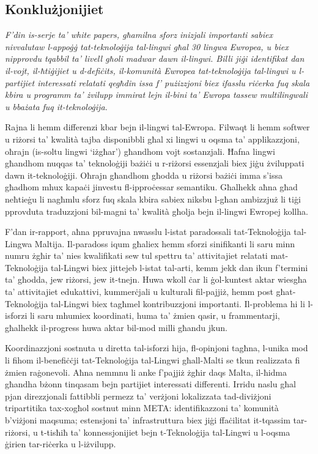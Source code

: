 \documentclass[]{../../metanetpaper}
\begin{document}
\begin{multicols}{2}
\subsection{Konklużjonijiet}

\emph{F’din is-serje ta’ \emph{white papers}, għamilna sforz inizjali importanti sabiex nivvalutaw l-appoġġ tat-teknoloġija tal-lingwi għal 30 lingwa Ewropea, u biex nipprovdu tqabbil ta’ livell għoli madwar dawn il-lingwi. Billi jiġi identifikat dan il-vojt, il-ħtiġijiet u d-defiċits, il-komunità Ewropea tat-teknoloġija tal-lingwi u l-partijiet interessati relatati qegħdin issa f’ pużizzjoni biex ifasslu riċerka fuq skala kbira u programm ta’ żvilupp immirat lejn il-bini ta’ Ewropa tassew multilingwali u bbażata fuq it-teknoloġija.}

Rajna li hemm differenzi kbar bejn il-lingwi tal-Ewropa. Filwaqt li hemm softwer u riżorsi ta’ kwalità tajba disponibbli għal xi lingwi u oqsma ta’ applikazzjoni, oħrajn (is-soltu lingwi `iżgħar') għandhom vojt sostanzjali.  Ħafna lingwi għandhom nuqqas ta’ teknoloġiji bażiċi u r-riżorsi essenzjali biex jiġu żviluppati dawn it-teknoloġiji. Oħrajn għandhom għodda u riżorsi bażiċi imma s’issa għadhom mhux kapaċi jinvestu fl-ipproċessar semantiku. Għalhekk aħna għad neħtieġu li nagħmlu sforz fuq skala kbira sabiex niksbu l-għan ambizzjuż li tiġi pprovduta traduzzjoni bil-magni ta’ kwalità għolja bejn il-lingwi Ewropej kollha. 

F’dan ir-rapport, aħna ppruvajna nwasslu l-istat paradossali tat-Teknoloġija tal-Lingwa Maltija. Il-paradoss iqum għaliex hemm sforzi sinifikanti li saru minn numru żgħir ta’ nies kwalifikati sew  tul spettru ta’ attivitajiet relatati mat-Teknoloġija tal-Lingwi biex jittejeb l-istat tal-arti, kemm jekk dan ikun f’termini ta’ għodda, jew riżorsi, jew it-tnejn. Huwa wkoll ċar li ġol-kuntest aktar wiesgħa ta’ attivitajiet edukattivi, kummerċjali u kulturali fil-pajjiż, hemm post għat-Teknoloġija tal-Lingwi biex tagħmel kontribuzzjoni importanti. Il-problema hi li l-isforzi li saru mhumiex koordinati, huma ta’ żmien qasir, u frammentarji, għalhekk il-progress huwa aktar bil-mod milli għandu jkun. 

Koordinazzjoni sostnuta u diretta tal-isforzi hija, fl-opinjoni tagħna, l-unika mod li fihom il-benefiċċji tat-Teknoloġija tal-Lingwi għall-Malti se tkun realizzata fi żmien raġonevoli. Aħna nemmnu li anke f’pajjiż żgħir daqs Malta, il-ħidma għandha bżonn tinqasam bejn partijiet interessati differenti. Irridu naslu għal pjan direzzjonali fattibbli permezz ta’ verżjoni lokalizzata tad-diviżjoni tripartitika tax-xogħol sostnut minn META: identifikazzoni ta’ komunità b’viżjoni maqsuma; estensjoni ta’ infrastruttura biex jiġi ffaċilitat it-tqassim tar-riżorsi, u t-tisħiħ ta’ konnessjonijiet bejn t-Teknoloġija tal-Lingwi u l-oqsma ġirien tar-riċerka u l-iżvilupp.
\end{multicols}
\end{document}
